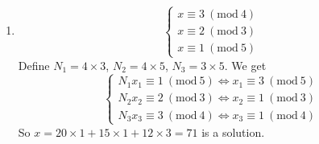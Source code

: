 \documentclass[11pt]{article}
\newcommand{\Mod}[1]{\ (\mathrm{mod}\ #1)}
\begin{document}
\begin{enumerate}
{\begin{enumerate}
{\begin{enumerate}
\end{enumerate}}
\item $$ \begin{cases} x \equiv 3 \Mod{4} \\ x \equiv 2 \Mod{3}\\ x \equiv 1 \Mod{5} \end{cases}$$
Define $N_1 = 4\times 3$, $N_2 = 4\times 5$, $N_3 = 3\times 5$.
We get $$ \begin{cases} N_1 x_1 \equiv 1 \Mod{5} \Leftrightarrow x_1 \equiv 3\Mod{5} \\ N_2 x_2 \equiv 2 \Mod{3} \Leftrightarrow x_2 \equiv 1 \Mod{3} \\ N_3x_3 \equiv 3 \Mod{4} \Leftrightarrow x_3 \equiv 1 \Mod{4} \end{cases}$$
So $x = 20 \times 1 + 15\times 1 + 12 \times 3 = 71$ is a solution. 
\end{enumerate}}
\end{enumerate}
\end{document}
